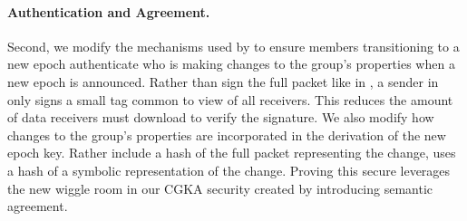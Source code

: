 \paragraph{Authentication and Agreement.}
Second, we modify the mechanisms used by \protITK to ensure members
transitioning to a new epoch authenticate who is making changes to the
group's properties when a new epoch is announced. Rather than sign the full
packet like in \protITK, a sender in \saik only signs a small tag common to
view of all receivers. This reduces the amount of data receivers must
download to verify the signature. We also modify how changes to the group's
properties are incorporated in the derivation of the new epoch key. Rather
include a hash of the full packet representing the change, \saik uses a hash
of a symbolic representation of the change. Proving this secure leverages the
new wiggle room in our CGKA security created by introducing semantic
agreement.














